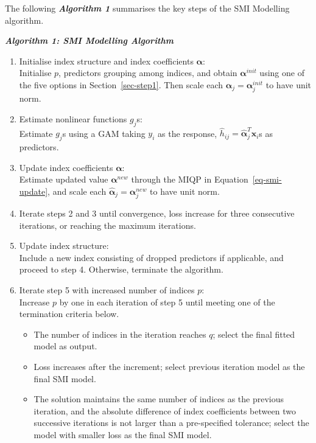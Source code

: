\documentclass[11pt,a4paper,]{article}
\providecommand{\tightlist}{%
  \setlength{\itemsep}{0pt}\setlength{\parskip}{0pt}}
\begin{document}
The following \textbf{\emph{Algorithm 1}} summarises the key steps of
the SMI Modelling algorithm. \newline

\textbf{\emph{Algorithm 1: SMI Modelling Algorithm}}

\begin{enumerate}
\def\labelenumi{\arabic{enumi}.}
\item
  Initialise index structure and index coefficients \(\bm{\alpha}\):\\
  Initialise \(p\), predictors grouping among indices, and obtain
  \(\bm{\alpha}^{init}\) using one of the five options in
  Section~\ref{sec-step1}. Then scale each
  \(\hat{\bm{\alpha}}_{j} = \bm{\alpha}_{j}^{init}\) to have unit norm.
\item
  Estimate nonlinear functions \(g_{j}\)s:\\
  Estimate \(g_{j}\)s using a GAM taking \(y_{i}\) as the response,
  \(\hat{h}_{ij} = \hat{\bm{\alpha}}_{j}^{T}\bm{x}_{i}\)s as predictors.
\item
  Update index coefficients \(\bm{\alpha}\):\\
  Estimate updated value \(\bm{\alpha}^{new}\) through the MIQP in
  Equation~\ref{eq-smi-update}, and scale each
  \(\hat{\bm{\alpha}}_{j} = \bm{\alpha}_{j}^{new}\) to have unit norm.
\item
  Iterate steps 2 and 3 until convergence, loss increase for three
  consecutive iterations, or reaching the maximum iterations.
\item
  Update index structure:\\
  Include a new index consisting of dropped predictors if applicable,
  and proceed to step 4. Otherwise, terminate the algorithm.
\item
  Iterate step 5 with increased number of indices \(p\):\\
  Increase \(p\) by one in each iteration of step 5 until meeting one of
  the termination criteria below.

  \begin{itemize}
  \tightlist
  \item
    The number of indices in the iteration reaches \(q\); select the
    final fitted model as output.
  \item
    Loss increases after the increment; select previous iteration model
    as the final SMI model.
  \item
    The solution maintains the same number of indices as the previous
    iteration, and the absolute difference of index coefficients between
    two successive iterations is not larger than a pre-specified
    tolerance; select the model with smaller loss as the final SMI
    model.
  \end{itemize}
\end{enumerate}
\end{document}
